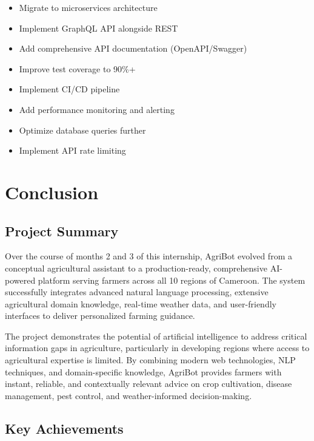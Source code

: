 \documentclass[12pt,a4paper]{article}
\begin{document}
\begin{itemize}[leftmargin=*]
    \item Migrate to microservices architecture
    \item Implement GraphQL API alongside REST
    \item Add comprehensive API documentation (OpenAPI/Swagger)
    \item Improve test coverage to 90\%+
    \item Implement CI/CD pipeline
    \item Add performance monitoring and alerting
    \item Optimize database queries further
    \item Implement API rate limiting
\end{itemize}

\section{Conclusion}

\subsection{Project Summary}

Over the course of months 2 and 3 of this internship, AgriBot evolved from a conceptual agricultural assistant to a production-ready, comprehensive AI-powered platform serving farmers across all 10 regions of Cameroon. The system successfully integrates advanced natural language processing, extensive agricultural domain knowledge, real-time weather data, and user-friendly interfaces to deliver personalized farming guidance.

The project demonstrates the potential of artificial intelligence to address critical information gaps in agriculture, particularly in developing regions where access to agricultural expertise is limited. By combining modern web technologies, NLP techniques, and domain-specific knowledge, AgriBot provides farmers with instant, reliable, and contextually relevant advice on crop cultivation, disease management, pest control, and weather-informed decision-making.

\subsection{Key Achievements}
\end{document}
